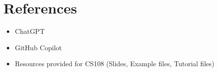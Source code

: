 \documentclass{article}
\begin{document}
\section{References}
\begin{itemize}
    \item ChatGPT
    \item GitHub Copilot
    \item Resources provided for CS108 (Slides, Example files, Tutorial files)
\end{itemize}
\end{document}
